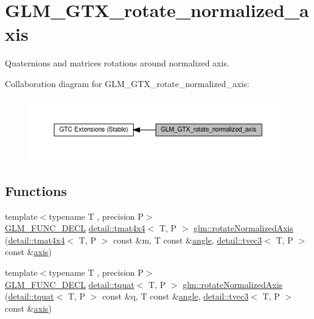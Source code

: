 \hypertarget{group__gtx__rotate__normalized__axis}{}\section{G\+L\+M\+\_\+\+G\+T\+X\+\_\+rotate\+\_\+normalized\+\_\+axis}
\label{group__gtx__rotate__normalized__axis}


Quaternions and matrices rotations around normalized axis.  


Collaboration diagram for G\+L\+M\+\_\+\+G\+T\+X\+\_\+rotate\+\_\+normalized\+\_\+axis\+:\nopagebreak
\begin{figure}[H]
\begin{center}
\leavevmode
\includegraphics[width=350pt]{group__gtx__rotate__normalized__axis}
\end{center}
\end{figure}
\subsection*{Functions}
\begin{DoxyCompactItemize}
\item 
{\footnotesize template$<$typename T , precision P$>$ }\\\hyperlink{setup_8hpp_ab2d052de21a70539923e9bcbf6e83a51}{G\+L\+M\+\_\+\+F\+U\+N\+C\+\_\+\+D\+E\+CL} \hyperlink{structglm_1_1detail_1_1tmat4x4}{detail\+::tmat4x4}$<$ T, P $>$ \hyperlink{group__gtx__rotate__normalized__axis_gac47b4efcecdaf7e892b10ae89135c544}{glm\+::rotate\+Normalized\+Axis} (\hyperlink{structglm_1_1detail_1_1tmat4x4}{detail\+::tmat4x4}$<$ T, P $>$ const \&m, T const \&\hyperlink{group__gtc__quaternion_ga23a3fc7ada5bbb665ff84c92c6e0542c}{angle}, \hyperlink{structglm_1_1detail_1_1tvec3}{detail\+::tvec3}$<$ T, P $>$ const \&\hyperlink{group__gtc__quaternion_ga8eef9f8c3f2e4836dccf09df975b20fb}{axis})
\item 
{\footnotesize template$<$typename T , precision P$>$ }\\\hyperlink{setup_8hpp_ab2d052de21a70539923e9bcbf6e83a51}{G\+L\+M\+\_\+\+F\+U\+N\+C\+\_\+\+D\+E\+CL} \hyperlink{structglm_1_1detail_1_1tquat}{detail\+::tquat}$<$ T, P $>$ \hyperlink{group__gtx__rotate__normalized__axis_ga774f0f09fc99b3a967001cb116aa7f2a}{glm\+::rotate\+Normalized\+Axis} (\hyperlink{structglm_1_1detail_1_1tquat}{detail\+::tquat}$<$ T, P $>$ const \&q, T const \&\hyperlink{group__gtc__quaternion_ga23a3fc7ada5bbb665ff84c92c6e0542c}{angle}, \hyperlink{structglm_1_1detail_1_1tvec3}{detail\+::tvec3}$<$ T, P $>$ const \&\hyperlink{group__gtc__quaternion_ga8eef9f8c3f2e4836dccf09df975b20fb}{axis})
\end{DoxyCompactItemize}


